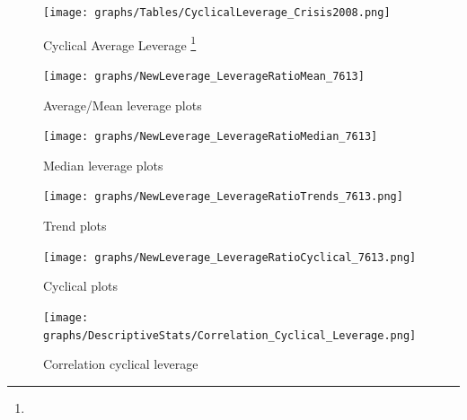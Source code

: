 \documentclass[12pt, a4paper]{article} %
\begin{document}
\begin{figure}[hbtp]
\begin{minipage}{\textwidth}
\centering
\caption[1]{Cyclical Average Leverage \footnote{}}
\texttt{[image: graphs/Tables/CyclicalLeverage\_Crisis2008.png]}
\label{table:CyclicalLeverageFinancCrisis}
\end{minipage}
\end{figure}

\iffalse

\begin{figure}[hbtp]
\centering
\caption{Average/Mean leverage plots}
\texttt{[image: graphs/NewLeverage\_LeverageRatioMean\_7613]}
\end{figure}


\begin{figure}[hbtp]
\centering
\caption{Median leverage plots}
\texttt{[image: graphs/NewLeverage\_LeverageRatioMedian\_7613]}
\end{figure}



\begin{figure}[hbtp]
\centering
\caption{Trend plots}
\texttt{[image: graphs/NewLeverage\_LeverageRatioTrends\_7613.png]}
\end{figure}



\begin{figure}[hbtp]
\centering
\caption{Cyclical plots}
\texttt{[image: graphs/NewLeverage\_LeverageRatioCyclical\_7613.png]}
\end{figure}



\begin{figure}[hbtp]
\centering
\caption{Correlation cyclical leverage}
\texttt{[image: graphs/DescriptiveStats/Correlation\_Cyclical\_Leverage.png]}
\end{figure}
\end{document}
